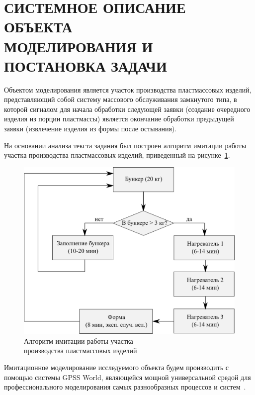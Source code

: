 \section[Системное описание объекта моделирования и постановка задачи]{
  СИСТЕМНОЕ ОПИСАНИЕ ОБЪЕКТА  \\ 
  МОДЕЛИРОВАНИЯ И ПОСТАНОВКА ЗАДАЧИ}
\label{sec:task_analisys}

Объектом моделирования является участок производства пластмассовых
изделий, представляющий собой систему массового обслуживания 
замкнутого типа, в которой сигналом для начала обработки следующей заявки
(создание очередного изделия из порции пластмассы)
является окончание обработки предыдущей заявки
(извлечение изделия из формы после остывания).

На основании анализа текста задания был построен алгоритм
имитации работы участка производства пластмассовых изделий,
приведенный на рисунке~\ref{pic:scheme}.

\begin{figure}[h!]
  \centering
  \includegraphics[width=130mm]{pic/scheme}
  \caption{Алгоритм имитации работы участка \\ 
    производства пластмассовых изделий}
  \label{pic:scheme}
\end{figure}

Имитационное моделирование исследуемого объекта будем производить с помощью системы GPSS World,
являющейся мощной универсальной средой для профессионального моделирования самых разнообразных
процессов и систем~\cite{ims_batin_2,ims_boev,ims_kudryavtsev,ims_tomashevskiy,ims_shraiber}.